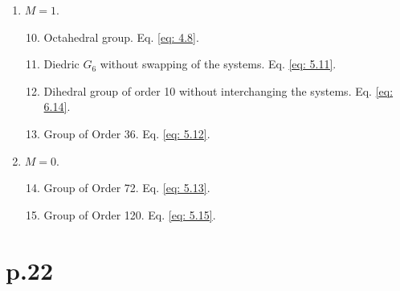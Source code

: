 \documentclass[leqno]{article}
\begin{document}
\begin{enumerate}[label=\alph*.]
    \item $M=1$. 
    \begin{enumerate}[label=\arabic*)]
    	\setcounter{enumii}{9}
    	\item Octahedral group. Eq. \eqref{eq: 4.8}. 
    	\item Diedric $G_6$ without swapping of the systems. Eq. \eqref{eq: 5.11}.
    	\item Dihedral group of order 10 without interchanging the systems. Eq. \eqref{eq: 6.14}.
    	\item Group of Order 36. Eq. \eqref{eq: 5.12}.
    \end{enumerate}
    \item $M=0$. 
    \begin{enumerate}[label=\arabic*)]
    	\setcounter{enumii}{13}
    	\item Group of Order 72. Eq. \eqref{eq: 5.13}.   
    	\item Group of Order 120. Eq. \eqref{eq: 5.15}.
    \end{enumerate}
\end{enumerate}

\section{p.22}
\end{document}
